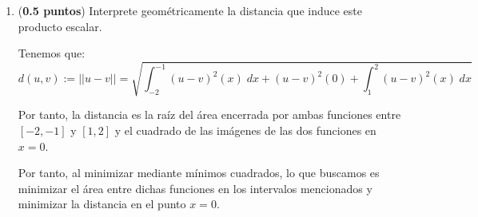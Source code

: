 \documentclass[12pt]{article}
\begin{document}
\begin{ejercicio} 
\begin{enumerate}
        Por tanto,
        \begin{equation*}
            0 \leq -2\lambda \langle f-u,g\rangle +\lambda^2 ||g||^2
            \qquad \forall \lambda\in \bb{R}, \forall g\in \bb{P}_2.
        \end{equation*}

        Considerando la expresión anterior como una parábola en la incógnita $\lambda$, tenemos:
        \begin{equation*}
            \Delta = 4(\langle f-u,g\rangle)^2 \geq 0
        \end{equation*}

        Por tanto, para que la parábola siempre sea positiva, no puede tener dos raíces. Por tanto, $\Delta=0$, lo que implica que:
        \begin{equation*}
            \langle f-u,g\rangle = 0 \qquad \forall g\in \bb{P}_2
        \end{equation*}

        Por tanto, hemos demostrado que $f(x) - u(x)$ es ortogonal a todos los polinomios de grado menor o igual a dos.
        
        \item (\textbf{0.5 puntos}) Interprete geométricamente la distancia que induce este producto escalar.
        
        Tenemos que:
        \begin{equation*}
            d(u,v) := ||u-v||
            = \sqrt{\int_{-2}^{-1}(u-v)^2(x)\;dx + (u-v)^2(0) + \int_{1}^{2}(u-v)^2(x)\;dx}
        \end{equation*}

        Por tanto, la distancia es la raíz del área encerrada por ambas funciones entre $[-2, -1]$ y $[1,2]$ y el cuadrado de las imágenes de las dos funciones en $x=0$.

        Por tanto, al minimizar mediante mínimos cuadrados, lo que buscamos es minimizar el área entre dichas funciones en los intervalos mencionados y minimizar la distancia en el punto $x=0$.
        

        
    \end{enumerate}
\end{ejercicio}


    
\end{document}
